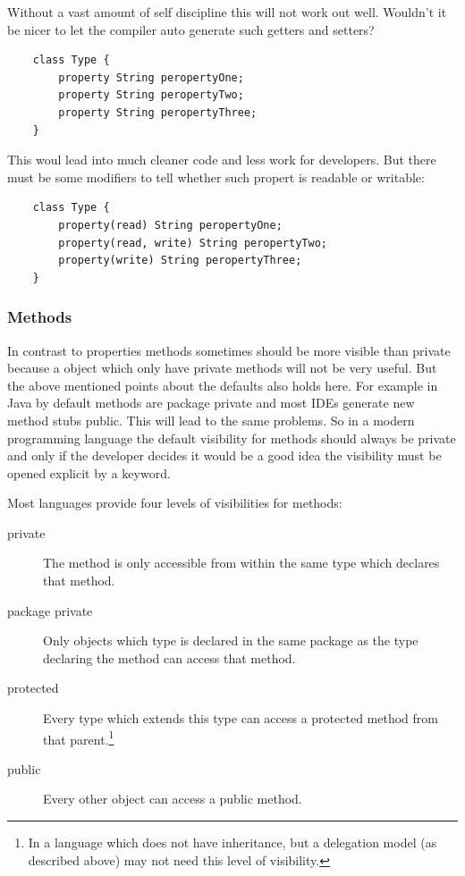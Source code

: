 \documentclass[11pt, a4paper]{report}
\begin{document}
Without a vast amount of self discipline this will not work out well. Wouldn't it be nicer to let the compiler auto generate such getters and setters?

\begin{lstlisting}
    class Type {
        property String peropertyOne;
        property String peropertyTwo;
        property String peropertyThree;
    }
\end{lstlisting}

This woul lead into much cleaner code and less work for developers. But there must be some modifiers to tell whether such propert is readable or writable:

\begin{lstlisting}
    class Type {
        property(read) String peropertyOne;
        property(read, write) String peropertyTwo;
        property(write) String peropertyThree;
    }
\end{lstlisting}

    
\subsubsection{Methods}

In contrast to properties methods sometimes should be more visible than private because a object which only have private methods will not be very useful. But the above mentioned points about the defaults also holds here. For example in Java by default methods are package private and most IDEs generate new method stubs public. This will lead to the same problems. So in a modern programming language the default visibility for methods should always be private and only if the developer decides it would be a good idea the visibility must be opened explicit by a keyword.

Most languages provide four levels of visibilities for methods:

\begin{description}
    \item[private] The method is only accessible from within the same type which declares that method.
    \item[package private] Only objects which type is declared in the same package as the type declaring the method can access that method.
    \item[protected] Every type which extends this type can access a protected method from that parent.\footnote{In a language which does not have inheritance, but a delegation model (as described above) may not need this level of visibility.}
    \item[public] Every other object can access a public method.
\end{description}
\end{document}
